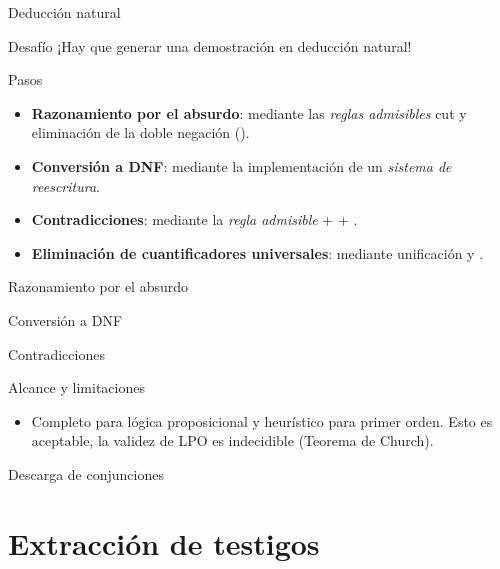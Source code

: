 \documentclass[xcolor={dvipsnames},spanish]{beamer}
\begin{document}
\begin{frame}{Deducción natural}
    \begin{alertblock}{Desafío}
        ¡Hay que generar una demostración en deducción natural!
    \end{alertblock}

    Pasos

    \begin{itemize}
        \item \textbf{Razonamiento por el absurdo}: mediante las \textit{reglas admisibles} cut y eliminación de la doble negación ().
        \item \textbf{Conversión a DNF}: mediante la implementación de un \textit{sistema de reescritura}.
        \item \textbf{Contradicciones}: mediante la \textit{regla admisible}  +  + .
        \item \textbf{Eliminación de cuantificadores universales}: mediante unificación y .
    \end{itemize}
\end{frame}

\begin{frame}{Razonamiento por el absurdo}
    
\end{frame}

\begin{frame}{Conversión a DNF}
    
\end{frame}

\begin{frame}{Contradicciones}
    
\end{frame}

\begin{frame}{Alcance y limitaciones}
    \begin{itemize}
        \item Completo para lógica proposicional y heurístico para primer orden. Esto es aceptable, la validez de LPO es indecidible (Teorema de Church).
    \end{itemize}
\end{frame}

\begin{frame}{Descarga de conjunciones}
    
\end{frame}

\section{Extracción de testigos}
\end{document}
